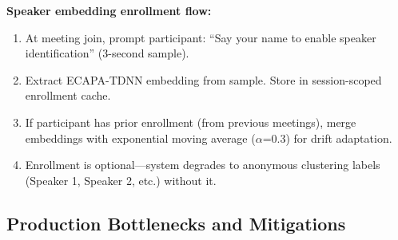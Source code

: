 \textbf{Speaker embedding enrollment flow:}

\begin{enumerate}
  \item At meeting join, prompt participant: ``Say your name to enable speaker identification'' (3-second sample).
  \item Extract ECAPA-TDNN embedding from sample. Store in session-scoped enrollment cache.
  \item If participant has prior enrollment (from previous meetings), merge embeddings with exponential moving average ($\alpha$=0.3) for drift adaptation.
  \item Enrollment is optional---system degrades to anonymous clustering labels (Speaker 1, Speaker 2, etc.) without it.
\end{enumerate}

\subsection*{Production Bottlenecks and Mitigations}

